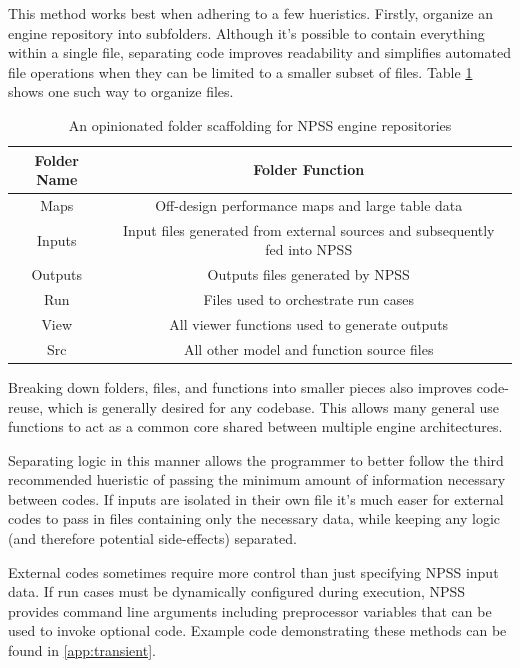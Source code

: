 \documentclass[heading.tex]{subfiles}
\begin{document}
This method works best when adhering to a few hueristics. Firstly, organize an engine repository
into subfolders. Although it's possible to contain everything within a single file, separating code
improves readability and simplifies automated file operations when they can be limited to a smaller subset of files.
Table \ref{tab:Scaffolding} shows one such way to organize files.

\begin{table}[H]
\centering
\begin{tabular}{|c|c|}
\hline 
Folder Name & Folder Function \\ 
\hline \hline
Maps & Off-design performance maps and large table data \\ 
\hline 
Inputs & Input files generated from external sources and subsequently fed into NPSS \\ 
\hline 
Outputs & Outputs files generated by NPSS \\ 
\hline 
Run & Files used to orchestrate run cases \\ 
\hline 
View & All viewer functions used to generate outputs \\ 
\hline 
Src & All other model and function source files \\ 
\hline 
\end{tabular} 
\caption{An opinionated folder scaffolding for NPSS engine repositories}
\label{tab:Scaffolding}
\end{table}

Breaking down folders, files, and functions into smaller pieces also improves code-reuse,
which is generally desired for any codebase.
This allows many general use functions to act as a common core shared between multiple engine architectures.

Separating logic in this manner allows the programmer to better follow the third recommended hueristic
of passing the minimum amount of information necessary between codes. If inputs are isolated in their own file
it's much easer for external codes to pass in files containing only the necessary data, 
while keeping any logic (and therefore potential side-effects) separated.

External codes sometimes require more control than just specifying NPSS input data.
If run cases must be dynamically configured during execution,
NPSS provides command line arguments \cite[chap.~2.1]{NPSS}
including preprocessor variables that can be used to invoke optional code.
Example code demonstrating these methods can be found in \cref{app:transient}.
\end{document}
